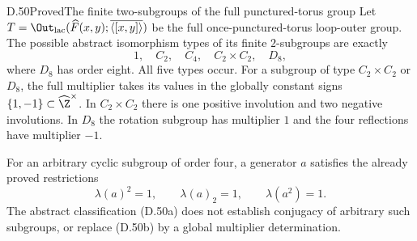 \begin{claim}{D.50}{Proved}{The finite two-subgroups of the full punctured-torus group}
Let
$T=\Out_{\rm lac}(\widehat F(x,y);
\overline{\langle[x,y]\rangle})$ be the full
once-punctured-torus loop-outer group.
The possible abstract isomorphism types of its finite
$2$-subgroups are exactly
\[
                  1,\quad C_2,\quad C_4,\quad
                         C_2\times C_2,\quad D_8,
                                                        \tag{D.50a}
\]
where $D_8$ has order eight. All five types occur.
For a subgroup of type $C_2\times C_2$ or $D_8$,
the full multiplier takes its values in the globally
constant signs $\{1,-1\}\subset\widehat\Z^\times$.
In $C_2\times C_2$ there is one positive involution
and two negative involutions. In $D_8$ the rotation
subgroup has multiplier $1$ and the four reflections
have multiplier $-1$.

For an arbitrary cyclic subgroup of order four,
a generator $a$ satisfies the already proved
restrictions
\[
           \lambda(a)^2=1,\qquad \lambda(a)_2=1,
           \qquad \lambda(a^2)=1.                       \tag{D.50b}
\]
The abstract classification (D.50a) does not establish
conjugacy of arbitrary such subgroups, or replace
(D.50b) by a global multiplier determination.
\end{claim}

